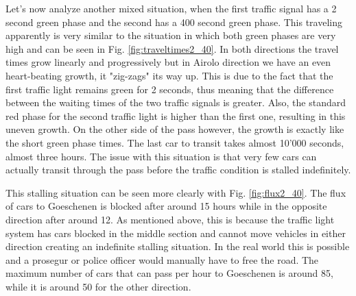 \documentclass[11pt,a4paper,parskip=half-]{article}
\begin{document}
\vspace{2cm}


Let's now analyze another mixed situation, when the first traffic signal has a 2 second green phase and the second has a 400 second green phase. This traveling apparently is very similar to the situation in which both green phases are very high and can be seen in Fig. \ref{fig:traveltimes2_40}. In both directions the travel times grow linearly and progressively but in Airolo direction we have an even heart-beating growth, it "zig-zags" its way up. This is due to the fact that the first traffic light remains green for 2 seconds, thus meaning that the difference between the waiting times of the two traffic signals is greater. Also, the standard red phase for the second traffic light is higher than the first one, resulting in this uneven growth. On the other side of the pass however, the growth is exactly like the short green phase times. The last car to transit takes almost 10'000 seconds, almost three hours. The issue with this situation is that very few cars can actually transit through the pass before the traffic condition is stalled indefinitely.






This stalling situation can be seen more clearly with Fig. \ref{fig:flux2_40}. The flux of cars to Goeschenen is blocked after around 15 hours while in the opposite direction after around 12. As mentioned above, this is because the traffic light system has cars blocked in the middle section and cannot move vehicles in either direction creating an indefinite stalling situation. In the real world this is possible and a prosegur  or police officer would manually have to free the road. The maximum number of cars that can pass per hour to Goeschenen is around 85, while it is around 50 for the other direction. 
\end{document}
